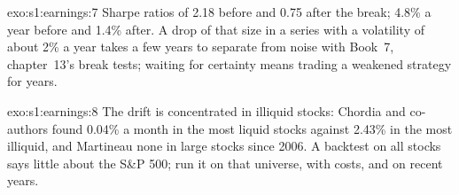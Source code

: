 \begin{solution}{exo:s1:earnings:7}
Sharpe ratios of 2.18 before and 0.75 after the break; 4.8\% a year before and 1.4\% after. A drop of that size in a series with a volatility of about 2\% a
year takes a few years to separate from noise with Book~7, chapter~13's break tests; waiting for certainty means trading a weakened strategy for years.
\end{solution}

\begin{solution}{exo:s1:earnings:8}
The drift is concentrated in illiquid stocks: Chordia and co-authors found 0.04\% a month in the most liquid stocks against 2.43\% in the most illiquid, and
Martineau none in large stocks since 2006. A backtest on all stocks says little about the S\&P 500; run it on that universe, with costs, and on recent
years.
\end{solution}

